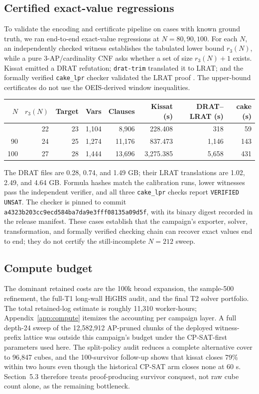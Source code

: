 \subsection{Certified exact-value regressions}\label{certified-exact-value-regressions}

To validate the encoding and certificate pipeline on cases with known
ground truth, we ran end-to-end exact-value regressions at $N=80,90,100$.
For each $N$, an independently checked witness establishes the tabulated
lower bound $r_3(N)$, while a pure 3-AP/cardinality CNF asks whether a set of
size $r_3(N)+1$ exists. Kissat emitted a DRAT refutation; \texttt{drat-trim}
translated it to LRAT; and the formally verified \texttt{cake\_lpr} checker
validated the LRAT proof \cite{tan-heule-myreen-cakelpr-2021}. The upper-bound
certificates do not use the OEIS-derived window inequalities.

{\def\LTcaptype{none} %
\begin{longtable}[]{@{}rrrrrrrr@{}}
\toprule\noalign{}
$N$ & $r_3(N)$ & Target & Vars & Clauses & Kissat (s) & DRAT--LRAT (s) & cake (s) \\
\midrule\noalign{}
\endhead
\bottomrule\noalign{}
\endlastfoot
80 & 22 & 23 & 1,104 & 8,906 & 228.408 & 318 & 59 \\
90 & 24 & 25 & 1,274 & 11,176 & 837.473 & 1,146 & 143 \\
100 & 27 & 28 & 1,444 & 13,696 & 3,275.385 & 5,658 & 431 \\
\end{longtable}
}

The DRAT files are 0.28, 0.74, and 1.49 GB; their LRAT translations are
1.02, 2.49, and 4.64 GB. Formula hashes match the calibration runs, lower
witnesses pass the independent verifier, and all three \texttt{cake\_lpr}
checks report \texttt{VERIFIED UNSAT}. The checker is pinned to commit
\texttt{a4323b203cc9ecd584ba7da9e3fff08135a09d5f}, with its binary digest
recorded in the release manifest. These cases establish that the campaign's
exporter, solver, transformation, and formally verified checking chain can
recover exact values end to end; they do not certify the still-incomplete
$N=212$ sweep.

\subsection{Compute budget}\label{compute-budget}

The dominant retained costs are the 100k broad expansion, the
sample-500 refinement, the full-T1 long-wall HiGHS audit, and the final
T2 solver portfolio. The total retained-log estimate is roughly 11,310
worker-hours; Appendix~\ref{app:compute}
itemizes the accounting per campaign layer. A full depth-24 sweep of
the 12,582,912 AP-pruned chunks of the deployed witness-prefix lattice was
outside this campaign's budget under the CP-SAT-first parameters used here.
The split-policy audit reduces a complete alternative cover to 96,847 cubes,
and the 100-survivor follow-up shows that kissat closes 79\% within two hours
even though the historical CP-SAT arm closes none at 60 s. Section~5.3
therefore treats proof-producing survivor conquest, not raw cube count alone,
as the remaining bottleneck.

